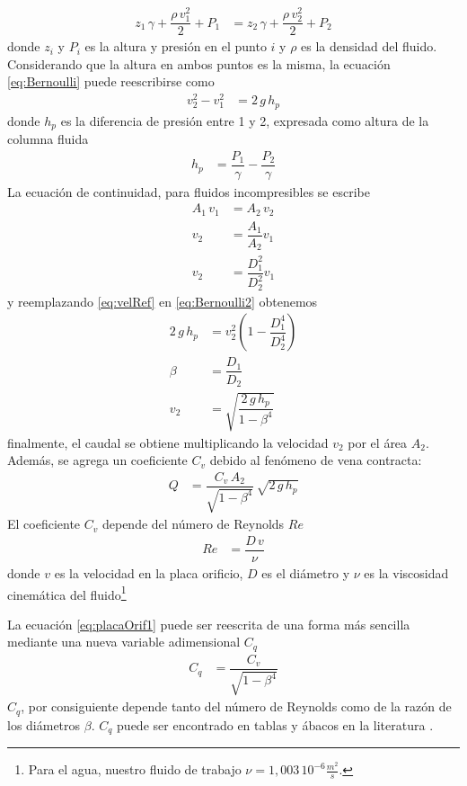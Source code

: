 \begin{align}
 z_1 \, \gamma + \dfrac{\rho \,v_1^2}{2} + P_1 &= z_2 \, \gamma + \dfrac{\rho \,v_2^2}{2} + P_2
\label{eq:Bernoulli}
\end{align}
donde $z_i$ y $P_i$ es la altura y presión en el punto $i$ y $\rho$ es 
la densidad del fluido. 
Considerando que la altura en ambos puntos es la misma, la ecuación
\eqref{eq:Bernoulli} puede reescribirse como
\begin{align}
 v_2^2 - v_1^2 &= 2\,g\,h_p
 \label{eq:Bernoulli2}
\end{align}
donde $h_p$ es la diferencia de presión entre 1 y 2, expresada como 
altura de la columna fluida
\begin{align}
 h_p &= \dfrac{P_1}{\gamma}-\dfrac{P_2}{\gamma}
\end{align}
La ecuación de continuidad, para fluidos incompresibles se escribe
\begin{align}
 A_1\,v_1 &= A_2\,v_2 \\
 v_2 &= \dfrac{A_1}{A_2} v_1 \\
 v_2 &= \dfrac{D_1^2}{D_2^2} v_1
 \label{eq:velRef}
\end{align}
y reemplazando \eqref{eq:velRef} en \eqref{eq:Bernoulli2} obtenemos
\begin{align}
 2 \, g \, h_p &= v_2^2 \left( 1 - \dfrac{D_1^4}{D_2^4} \right)\\
 \beta &= \dfrac{D_1}{D_2}\\
 v_2 &= \sqrt{\dfrac{2 \, g \, h_p}{1-\beta^4}}
\end{align}
finalmente, el caudal se obtiene multiplicando la velocidad $v_2$ por el
área $A_2$.
Además, se agrega un coeficiente $C_v$ debido al fenómeno de vena contracta:
\begin{align}
 Q &= \dfrac{C_v \, A_2}{\sqrt{1-\beta^4}}\, \sqrt{2 \, g \, h_p}
 \label{eq:placaOrif1}
\end{align}
El coeficiente $C_v$ depende del número de Reynolds $Re$ \cite{bib:Mataix, bib:ApuntesPuglesiPlacaOrif}
\begin{align}
Re &= \dfrac{D\,v}{\nu}
\end{align}
donde $v$ es la velocidad en la placa orificio, $D$ es el diámetro y ${\nu}$
es la viscosidad cinemática del fluido\footnote{Para el agua, nuestro fluido de
trabajo $\nu = 1,003\,10^{-6} \frac{m^2}{s}$.}

La ecuación \eqref{eq:placaOrif1} puede ser reescrita de una forma más sencilla
mediante una nueva variable adimensional $C_q$
\begin{align}
 C_q &= \dfrac{C_v}{\sqrt{1-\beta^4}}
\end{align}
$C_q$, por consiguiente depende tanto del número de Reynolds como de la razón
de los diámetros $\beta$. $C_q$ puede ser encontrado en tablas y ábacos en la
literatura \cite{bib:Mataix}.

